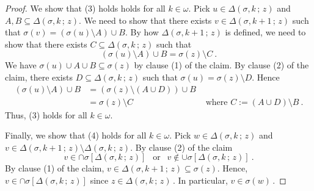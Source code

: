 \documentclass[10pt,a4paper]{amsart}
\begin{document}
\begin{proof}
We show that (3) holds   holds for all $ k   \in  \omega   $. 
Pick     $  u  \in  \Delta \left(  \sigma , k   \,  ;   \,   z  \right)   $  and    $  A,  B   \subseteq  \Delta \left(  \sigma , k   \,  ;   \,   z  \right)   $. 
We need to show that  there exists   $  v  \in    \Delta \left(  \sigma , k +1   \,  ;   \,   z  \right)    $  such that  
$  \sigma (v)  =      \left(   \sigma (u)  \setminus   A   \right)  \cup   B  $. 
By how  $   \Delta \left(  \sigma , k +1   \,  ;   \,   z  \right)      $  is defined,  
  we need to show that 
there exists  $  C  \subseteq    \Delta \left(  \sigma , k   \,  ;   \,   z  \right)   $  such that 
\[
 \left(   \sigma (u)  \setminus   A   \right)  \cup   B    =    \sigma (z)   \setminus  C
 \       .
\]
We have  $ \sigma  (u)  \cup    A  \cup  B   \subseteq   \sigma (z)  $  by clause (1) of the claim.
By clause (2) of the claim,    there exists    $  D  \subseteq      \Delta \left(  \sigma , k   \,  ;   \,   z  \right)   $  such that 
$  \sigma  (u)  =   \sigma (z)  \setminus  D  $. 
Hence 
\begin{align*}
 \left(   \sigma (u)  \setminus   A   \right)  \cup   B    
 &=  
 \left(   \sigma (z)  \setminus   \left(  A  \cup   D  \right)     \right)  \cup   B  
 \\
 &=  \sigma (z)   \setminus  C
&    \mbox{  where  }   C  :=    \left(  A  \cup   D  \right)     \setminus    B  
 \        .
\end{align*}
Thus,   (3)  holds  for all $  k  \in  \omega  $.  






Finally,    we   show that (4) holds  for all  $  k  \in  \omega  $.
Pick  $  w  \in    \Delta \left(  \sigma , k   \,  ;   \,   z  \right)    $   and     $  v  \in   \Delta \left(  \sigma , k +1  \,  ;   \,   z  \right)     \setminus    \Delta \left(  \sigma , k   \,  ;   \,   z  \right)    $. 
By clause (2) of the claim 
\[
v  \in   \cap   \sigma   \left[    \Delta \left(  \sigma , k   \,  ;   \,   z  \right)     \right]  
\      \      \mbox{  or   }      \         \   
v    \not\in   \cup   \sigma   \left[    \Delta \left(  \sigma , k   \,  ;   \,   z  \right)     \right]  
\      .
\]
By clause  (1) of the claim,  $  v  \in   \Delta \left(  \sigma , k +1  \,  ;   \,   z  \right)     \subseteq  \sigma (z)  $. 
Hence,  $  v  \in   \cap   \sigma   \left[    \Delta \left(  \sigma , k   \,  ;   \,   z  \right)     \right]    $
since  $  z  \in     \Delta \left(  \sigma , k   \,  ;   \,   z  \right)           \,     $. 
In particular,    $  v   \in  \sigma (w)        \,    $. 






\end{proof}
\end{document}
